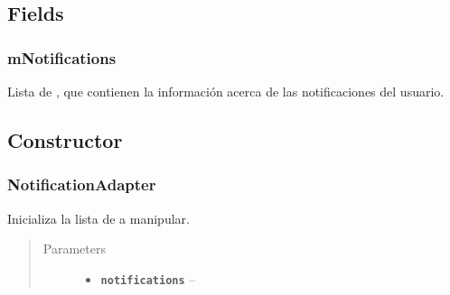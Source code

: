 \documentclass[letterpaper,10pt,english]{sphinxmanual}
\begin{document}
\subsection{Fields}
\label{Adapter/NotificationsAdapter:fields}

\subsubsection{mNotifications}
\label{Adapter/NotificationsAdapter:mnotifications}

\begin{fulllineitems}
\label{Adapter/NotificationsAdapter:com.fiuba.tallerii.jobify.NotificationAdapter.mNotifications}
Lista de , que contienen la información acerca de las notificaciones del usuario.

\end{fulllineitems}



\subsection{Constructor}
\label{Adapter/NotificationsAdapter:constructor}

\subsubsection{NotificationAdapter}
\label{Adapter/NotificationsAdapter:id1}

\begin{fulllineitems}
\label{Adapter/NotificationsAdapter:com.fiuba.tallerii.jobify.NotificationAdapter.NotificationAdapter(List)}
Inicializa la lista de  a manipular.
\begin{quote}\begin{description}
\item[{Parameters}] \leavevmode\begin{itemize}
\item {} 
\textbf{\texttt{notifications}} -- 

\end{itemize}

\end{description}\end{quote}

\end{fulllineitems}
\end{document}
